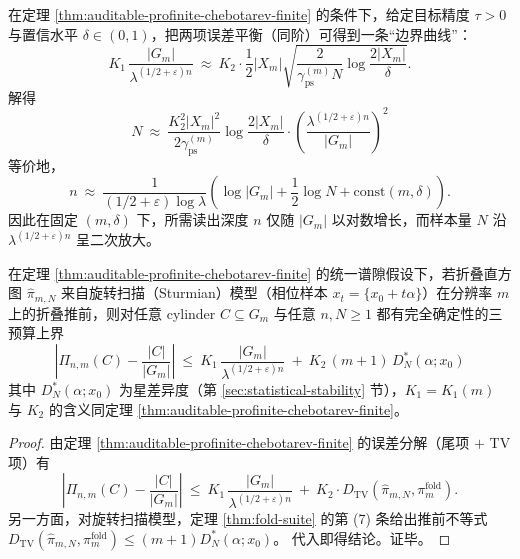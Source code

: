 \begin{corollary}\label{cor:auditable-profinite-chebotarev-tradeoff}
在定理 \ref{thm:auditable-profinite-chebotarev-finite} 的条件下，给定目标精度 \(\tau>0\) 与置信水平 \(\delta\in(0,1)\)，把两项误差平衡（同阶）可得到一条“边界曲线”：
\[
K_1\,\frac{|G_m|}{\lambda^{(1/2+\varepsilon)n}}
\ \approx\
K_2\cdot \frac12|X_m|\sqrt{\frac{2}{\gamma_{\mathrm{ps}}^{(m)}N}\log\frac{2|X_m|}{\delta}}.
\]
解得
\[
\boxed{\;
N\ \approx\
\frac{K_2^2|X_m|^2}{2\gamma_{\mathrm{ps}}^{(m)}}\log\frac{2|X_m|}{\delta}\cdot
\left(\frac{\lambda^{(1/2+\varepsilon)n}}{|G_m|}\right)^2
\;}
\]
等价地，
\[
\boxed{\;
n\ \approx\
\frac{1}{(1/2+\varepsilon)\log\lambda}\left(\log|G_m|+\frac12\log N+\mathrm{const}(m,\delta)\right).
\;}
\]
因此在固定 \((m,\delta)\) 下，所需读出深度 \(n\) 仅随 \(|G_m|\) 以对数增长，而样本量 \(N\) 沿 \(\lambda^{(1/2+\varepsilon)n}\) 呈二次放大。
\end{corollary}

\begin{corollary}[确定性三预算定律：差异度 \texorpdfstring{$\Rightarrow$}{=>} TV \texorpdfstring{$\Rightarrow$}{=>} Chebotarev]\label{cor:auditable-profinite-chebotarev-three-budget-deterministic}
在定理 \ref{thm:auditable-profinite-chebotarev-finite} 的统一谱隙假设下，若折叠直方图 \(\hat{\pi}_{m,N}\) 来自旋转扫描（Sturmian）模型（相位样本 \(x_t=\{x_0+t\alpha\}\)）在分辨率 \(m\) 上的折叠推前，则对任意 cylinder \(C\subseteq G_m\) 与任意 \(n,N\ge 1\) 都有完全确定性的三预算上界
\[
\boxed{\;
\left|\Pi_{n,m}(C)-\frac{|C|}{|G_m|}\right|
\ \le\
K_1\,\frac{|G_m|}{\lambda^{(1/2+\varepsilon)n}}
\ +\
K_2\,(m+1)\,D_N^*(\alpha;x_0)\;}
\]
其中 \(D_N^*(\alpha;x_0)\) 为星差异度（第 \ref{sec:statistical-stability} 节），\(K_1=K_1(m)\) 与 \(K_2\) 的含义同定理 \ref{thm:auditable-profinite-chebotarev-finite}。
\end{corollary}
\begin{proof}
由定理 \ref{thm:auditable-profinite-chebotarev-finite} 的误差分解（尾项 \(+\) TV 项）有
\[
\left|\Pi_{n,m}(C)-\frac{|C|}{|G_m|}\right|
\ \le\
K_1\,\frac{|G_m|}{\lambda^{(1/2+\varepsilon)n}}
\ +\
K_2\cdot D_{\mathrm{TV}}(\hat{\pi}_{m,N},\pi_m^{\mathrm{fold}}).
\]
另一方面，对旋转扫描模型，定理 \ref{thm:fold-suite} 的第 (7) 条给出推前不等式
\(
D_{\mathrm{TV}}(\hat{\pi}_{m,N},\pi_m^{\mathrm{fold}})\le (m+1)D_N^*(\alpha;x_0)
\)。
代入即得结论。证毕。
\end{proof}

